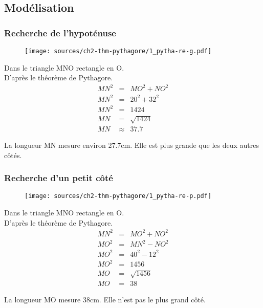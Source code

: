 \documentclass[11pt]{article}
\begin{document}
\newpage

\subsection{Modélisation}


\subsubsection{Recherche de l'hypoténuse }

\begin{multicols}{2}

  \begin{figure}[H]
    \centering
    \texttt{[image: sources/ch2-thm-pythagore/1\_pytha-re-g.pdf]}
  \end{figure}

  Dans le triangle MNO rectangle en O.\\
  D'après le théorème de Pythagore.
   \begin{eqnarray*}
    MN^2 &=& MO^2 + NO^2 \\
    MN^2 &=& 20^2 + 32^2 \\
    MN^2 &=&  1424\\
    MN   &=& \sqrt{1424} \\
    MN   &\approx& 37.7 
  \end{eqnarray*}
  
  La longueur MN mesure environ 27.7cm. Elle est plus grande que les deux autres côtés.
\end{multicols}


\subsubsection{Recherche d'un petit côté}

\begin{multicols}{2}

  \begin{figure}[H]
    \centering
    \texttt{[image: sources/ch2-thm-pythagore/1\_pytha-re-p.pdf]}
  \end{figure}

  Dans le triangle MNO rectangle en O.\\
  D'après le théorème de Pythagore.
  \begin{eqnarray*}
    MN^2 &=& MO^2 + NO^2 \\
    MO^2 &=& MN^2 - NO^2 \\
    MO^2 &=& 40^2 - 12^2 \\
    MO^2 &=& 1456\\
    MO   &=& \sqrt{1456} \\
    MO   &=& 38
  \end{eqnarray*}
  
  La longueur MO mesure 38cm. Elle n'est pas le plus grand côté.
\end{multicols}
\end{document}
